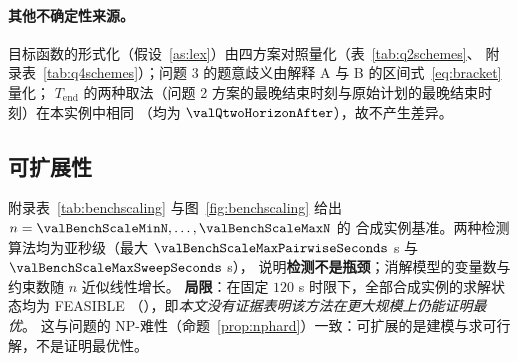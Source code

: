 \paragraph{其他不确定性来源。}目标函数的形式化（假设~\ref{as:lex}）由四方案对照量化（表~\ref{tab:q2schemes}、
附录表~\ref{tab:q4schemes}）；问题 3 的题意歧义由解释 A 与 B 的区间式~\eqref{eq:bracket} 量化；
$T_{\mathrm{end}}$ 的两种取法（问题 2 方案的最晚结束时刻与原始计划的最晚结束时刻）在本实例中相同
（均为 $\valQtwoHorizonAfter$），故不产生差异。

\subsection{可扩展性}

附录表~\ref{tab:benchscaling} 与图~\ref{fig:benchscaling} 给出 $n=\valBenchScaleMinN,\dots,\valBenchScaleMaxN$ 的
合成实例基准。两种检测算法均为亚秒级（最大 $\valBenchScaleMaxPairwiseSeconds$ s 与 $\valBenchScaleMaxSweepSeconds$ s），
说明\textbf{检测不是瓶颈}；消解模型的变量数与约束数随 $n$ 近似线性增长。
\textbf{局限}：在固定 $120$ s 时限下，全部合成实例的求解状态均为 \textsf{FEASIBLE}
（\valBenchScaleAllOptimal{}），即\emph{本文没有证据表明该方法在更大规模上仍能证明最优}。
这与问题的 NP-难性（命题~\ref{prop:nphard}）一致：可扩展的是建模与求可行解，不是证明最优性。
